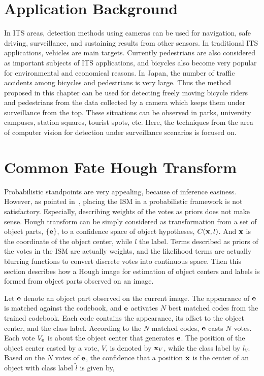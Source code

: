 \section{Application Background}
\label{ab4}
In ITS areas, detection methods using cameras can be used for navigation, safe driving, surveillance, and sustaining results from other sensors. In traditional ITS applications, vehicles are main targets. Currently pedestrians are also considered as important subjects of ITS applications, and bicycles also become very popular for environmental and economical reasons. In Japan, the number of traffic accidents among bicycles and pedestrians is very large. Thus the method proposed in this chapter can be used for detecting freely moving bicycle riders and pedestrians from the data collected by a camera which keeps them under surveillance from the top. These situations can be observed in parks, university campuses, station squares, tourist spots, etc.  Here, the techniques from the area of computer vision for detection under surveillance scenarios is focused on.

\section{Common Fate Hough Transform}
\label{pip4}
Probabilistic standpoints are very appealing, because of inference easiness. However, as pointed in~\citep{ac27}, placing the ISM in a probabilistic framework is not satisfactory. Especially, describing weights of the votes as priors does not make sense.
Hough transform can be simply considered as transformation from a set of  object parts, $\{\bf{e}\}$,  to a confidence space of object hypotheses, $C({\bf{x}},l)$. And $\bf{x}$ is the coordinate of the object center, while $l$ the label. Terms described as priors of the votes in the ISM are actually weights, and the likelihood terms are actually blurring functions to convert discrete votes into continuous space. Then this section describes how a Hough image for estimation of object centers and labels is formed from object parts observed on an image.


Let $\bf{e}$ denote an object part observed on the current image. The appearance of $\bf{e}$ is matched against the codebook, and $\bf{e}$ activates $N$ best matched codes from the trained codebook. Each code contains the appearance, its offset to the object center, and the class label. According to the $N$ matched codes, $\bf{e}$ casts $N$ votes. Each vote $V_{\bf{e}}$ is about the object center that generates $\bf{e}$. The position of the object center casted by  a vote, $V$, is denoted by ${\bf{x}}_V$, while the class label by $l_V$. Based on the $N$ votes of $\bf{e}$, the confidence that a position $\tilde{\bf{x}}$ is the center of an object with class label $\tilde{l}$ is given by,

